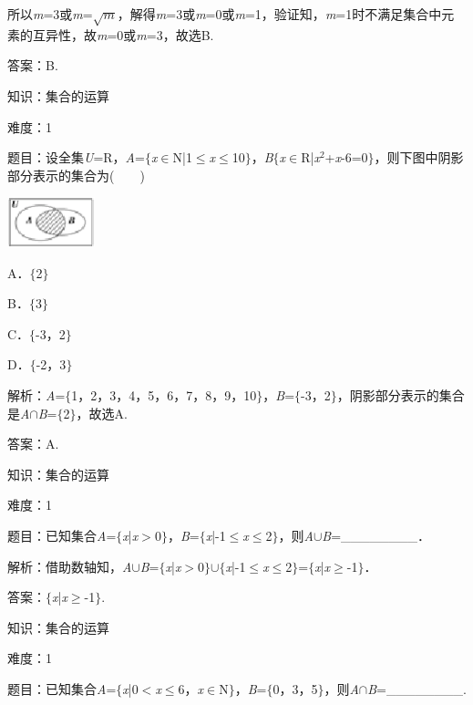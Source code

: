 \documentclass{article} %
\begin{document}
所以\textit{m}=3或\textit{m}=$\sqrt{m}$，解得\textit{m}=3或\textit{m}=0或\textit{m}=1，验证知，\textit{m}=1时不满足集合中元素的互异性，故\textit{m}=0或\textit{m}=3，故选B.

答案：B.

知识：集合的运算

难度：1

题目：设全集\textit{U}=R，\textit{A}=$\mathrm{\{}$\textit{x}$\mathrm{\in}$N|1$\mathrm{\le}$\textit{x}$\mathrm{\le}$10$\mathrm{\}}$，\textit{B}$\mathrm{\{}$\textit{x}$\mathrm{\in}$R|\textit{x}${}^{2}$+\textit{x}-6=0$\mathrm{\}}$，则下图中阴影部分表示的集合为(　　)

\includegraphics*[width=1.01in, height=0.57in, keepaspectratio=false]{image11}

A．$\mathrm{\{}$2$\mathrm{\}}$  

B．$\mathrm{\{}$3$\mathrm{\}}$ 

C．$\mathrm{\{}$-3，2$\mathrm{\}}$ 

D．$\mathrm{\{}$-2，3$\mathrm{\}}$

解析：\textit{A}=$\mathrm{\{}$1，2，3，4，5，6，7，8，9，10$\mathrm{\}}$，\textit{B}=$\mathrm{\{}$-3，2$\mathrm{\}}$，阴影部分表示的集合是\textit{A}$\mathrm{\cap}$\textit{B}=$\mathrm{\{}$2$\mathrm{\}}$，故选A.

答案：A.

知识：集合的运算

难度：1

题目：已知集合\textit{A}=$\mathrm{\{}$\textit{x}|\textit{x}$\mathrm{>}$0$\mathrm{\}}$，\textit{B}=$\mathrm{\{}$\textit{x}|-1$\mathrm{\le}$\textit{x}$\mathrm{\le}$2$\mathrm{\}}$，则\textit{A}$\mathrm{\cup}$\textit{B}=\_\_\_\_\_\_\_\_．

解析：借助数轴知，\textit{A}$\mathrm{\cup}$\textit{B}=$\mathrm{\{}$\textit{x}|\textit{x}$\mathrm{>}$0$\mathrm{\}}$$\mathrm{\cup}$$\mathrm{\{}$\textit{x}|-1$\mathrm{\le}$\textit{x}$\mathrm{\le}$2$\mathrm{\}}$=$\mathrm{\{}$\textit{x}|\textit{x}$\mathrm{\ge}$-1$\mathrm{\}}$．

答案：$\mathrm{\{}$\textit{x}|\textit{x}$\mathrm{\ge}$-1$\mathrm{\}}$.

知识：集合的运算

难度：1

题目：已知集合\textit{A}=$\mathrm{\{}$\textit{x}|0$\mathrm{<}$\textit{x}$\mathrm{\le}$6，\textit{x}$\mathrm{\in}$N$\mathrm{\}}$，\textit{B}=$\mathrm{\{}$0，3，5$\mathrm{\}}$，则\textit{A}$\mathrm{\cap}$\textit{B}=\_\_\_\_\_\_\_\_.
\end{document}
